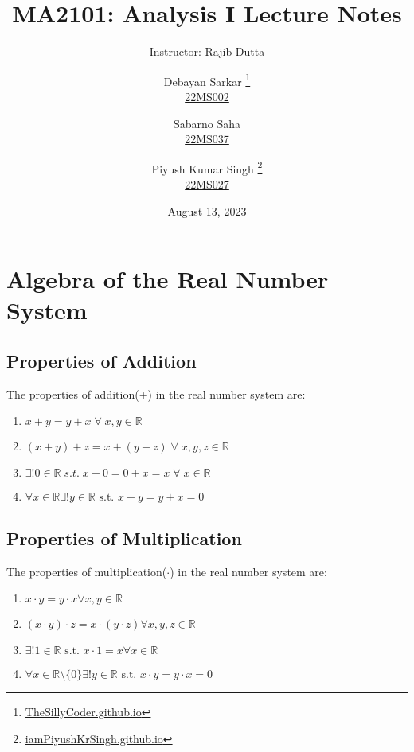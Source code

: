 \documentclass{scrartcl}
\newcommand{\rn}{\mathbb{R}}
\begin{document}
    \title{MA2101: Analysis I Lecture Notes}
    \subtitle{Instructor: Rajib Dutta}
    \author{
        Debayan Sarkar
            \thanks{{\href{https://thesillycoder.github.io}{TheSillyCoder.github.io}}}
            \\\href{mailto:ds22ms002@iiserkol.ac.in}{22MS002} \and
        Sabarno Saha
        \\\href{mailto:ss22ms037@iiserkol.ac.in}{22MS037} \and
        Piyush Kumar Singh
            \thanks{{\href{https://iampiyushkrsingh.github.io}{iamPiyushKrSingh.github.io}}}
            \\\href{mailto:pks22ms027@iiserkol.ac.in}{22MS027}
    }
    \date{August 13, 2023}
    \maketitle
    \tableofcontents
    \section{Algebra of the Real Number System}
    \subsection{Properties of Addition}
    The properties of addition(+) in the real number system are:
    \begin{enumerate}[label={(A\arabic*})]
        \item $x+y=y+x\; \forall \; x,y \in \mathbb{R}$
        \item $(x+y)+z = x+(y+z) \; \forall \; x,y,z \in \mathbb{R}$
        \item $ \exists !0 \in \mathbb{R} \; s.t.\; x+0 =0+x =x \; \forall \; x\in \mathbb{R}$
        \item $ \forall x \in \rn \exists! y \in \rn \text{ s.t. } x + y = y + x = 0$
    \end{enumerate}
    \subsection{Properties of Multiplication}
    The properties of multiplication($\cdot$) in the real number system are:
    \begin{enumerate}[label={(M\arabic*)}]
        \item $x\cdot y = y\cdot x \forall x, y \in \rn$ 
        \item $(x \cdot y)\cdot z = x\cdot (y \cdot z) \forall x, y, z \in \rn$
        \item $\exists ! 1 \in \rn \text{ s.t. } x \cdot 1 = x \forall x \in \rn$
        \item $\forall x\in \rn \setminus \{0\} \exists ! y \in \rn \text{ s.t. } x\cdot y = y \cdot x = 0$
    \end{enumerate}
\end{document}
